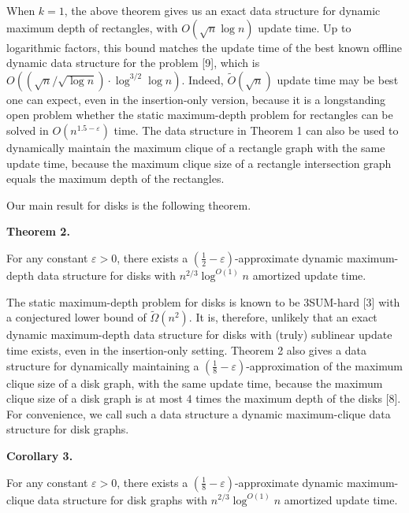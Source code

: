 \documentclass[10pt,a4paper]{article}
\begin{document}
When $k=1$, the above theorem gives us an exact data structure for dynamic maximum depth of rectangles, with $O(\sqrt{n}\log n)$ update time. Up to logarithmic factors, this bound matches the update time of the best known offline dynamic data structure for the problem [9], which is $O((\sqrt{n}/\sqrt{\log n})\cdot\log^{3/2}\log n)$. Indeed, $\widetilde{O}(\sqrt{n})$ update time may be best one can expect, even in the insertion-only version, because it is a longstanding open problem whether the static maximum-depth problem for rectangles can be solved in $O(n^{1.5-\varepsilon})$ time. The data structure in Theorem 1 can also be used to dynamically maintain the maximum clique of a rectangle graph with the same update time, because the maximum clique size of a rectangle intersection graph equals the maximum depth of the rectangles.
\par
\par
Our main result for disks is the following theorem.
\par
\par
\par\medskip\noindent\textbf{Theorem 2.}\par
For any constant $\varepsilon>0$, there exists a $(\frac{1}{2}-\varepsilon)$-approximate dynamic maximum-depth data structure for disks with $n^{2/3}\log^{O(1)}n$ amortized update time.
\par
\par
\par
The static maximum-depth problem for disks is known to be 3SUM-hard [3] with a conjectured lower bound of $\widetilde{\Omega}(n^{2})$. It is, therefore, unlikely that an exact dynamic maximum-depth data structure for disks with (truly) sublinear update time exists, even in the insertion-only setting. Theorem 2 also gives a data structure for dynamically maintaining a $(\frac{1}{8}-\varepsilon)$-approximation of the maximum clique size of a disk graph, with the same update time, because the maximum clique size of a disk graph is at most $4$ times the maximum depth of the disks [8]. For convenience, we call such a data structure a dynamic maximum-clique data structure for disk graphs.
\par
\par
\par\medskip\noindent\textbf{Corollary 3.}\par
For any constant $\varepsilon>0$, there exists a $(\frac{1}{8}-\varepsilon)$-approximate dynamic maximum-clique data structure for disk graphs with $n^{2/3}\log^{O(1)}n$ amortized update time.
\end{document}
